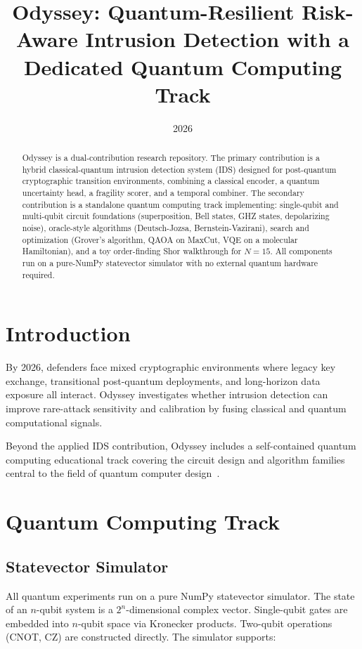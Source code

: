 \documentclass[conference]{IEEEtran}
\title{Odyssey: Quantum-Resilient Risk-Aware Intrusion Detection with a Dedicated Quantum Computing Track}
\author{\IEEEauthorblockN{George David Tsitlauri}
\IEEEauthorblockA{\textit{Dept. of Informatics \& Telecommunications}\\
\textit{University of Thessaly, Greece}\\
gdtsitlauri@gmail.com}}
\date{2026}
\begin{document}
\maketitle

\begin{abstract}
Odyssey is a dual-contribution research repository. The primary contribution is a hybrid classical-quantum intrusion detection system (IDS) designed for post-quantum cryptographic transition environments, combining a classical encoder, a quantum uncertainty head, a fragility scorer, and a temporal combiner. The secondary contribution is a standalone quantum computing track implementing: single-qubit and multi-qubit circuit foundations (superposition, Bell states, GHZ states, depolarizing noise), oracle-style algorithms (Deutsch-Jozsa, Bernstein-Vazirani), search and optimization (Grover's algorithm, QAOA on MaxCut, VQE on a molecular Hamiltonian), and a toy order-finding Shor walkthrough for $N=15$. All components run on a pure-NumPy statevector simulator with no external quantum hardware required.
\end{abstract}

\section{Introduction}

By 2026, defenders face mixed cryptographic environments where legacy key exchange, transitional post-quantum deployments, and long-horizon data exposure all interact. Odyssey investigates whether intrusion detection can improve rare-attack sensitivity and calibration by fusing classical and quantum computational signals.

Beyond the applied IDS contribution, Odyssey includes a self-contained quantum computing educational track covering the circuit design and algorithm families central to the field of quantum computer design~\cite{nielsen2010quantum}.

\section{Quantum Computing Track}

\subsection{Statevector Simulator}

All quantum experiments run on a pure NumPy statevector simulator. The state of an $n$-qubit system is a $2^n$-dimensional complex vector. Single-qubit gates are embedded into $n$-qubit space via Kronecker products. Two-qubit operations (CNOT, CZ) are constructed directly. The simulator supports:
\end{document}
